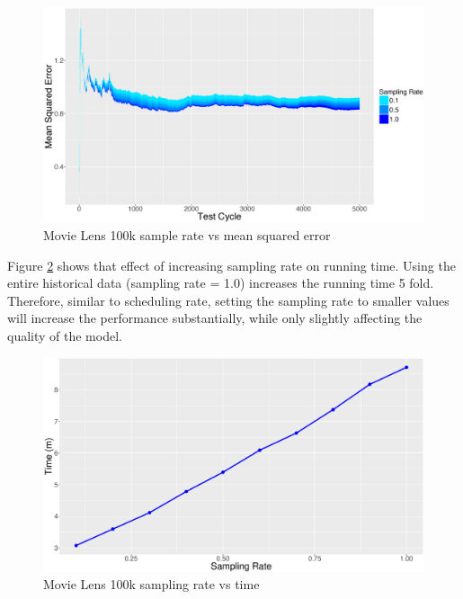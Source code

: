 \documentclass{vldb}
\begin{document}
\begin{figure}[!ht]
\centering
\includegraphics[width=\columnwidth]{../images/experiment-results/movie-lens-100k-sampling-rate-improved.eps}
\caption{Movie Lens 100k sample rate vs mean squared error}
\label{fig:movie-lens-100k-sample-rate}
\end{figure}

Figure \ref{fig:movie-lens-100k-sample-rate-time} shows that effect of increasing sampling rate on running time.
Using the entire historical data (sampling rate = 1.0) increases the running time 5 fold. 
Therefore, similar to scheduling rate, setting the sampling rate to smaller values will increase the performance substantially, while only slightly affecting the quality of the model.


\begin{figure}[H]
\centering
\includegraphics[width=\columnwidth]{../images/experiment-results/movie-lens-100k-sampling-time-improved.eps}
\caption{Movie Lens 100k sampling rate vs time}
\label{fig:movie-lens-100k-sample-rate-time}
\end{figure}
\end{document}
